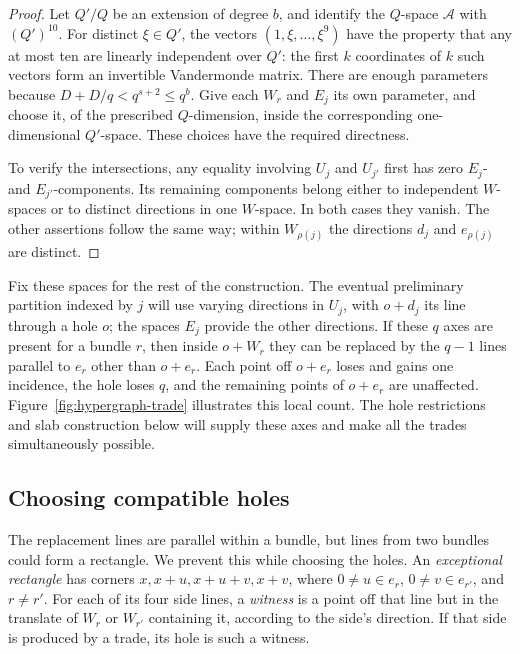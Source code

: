 \begin{proof}
Let $Q'/Q$ be an extension of degree $b$, and identify the $Q$-space
$\mathcal A$ with $(Q')^{10}$.  For distinct $\xi\in Q'$, the vectors
$(1,\xi,\ldots,\xi^9)$ have the property that any at most ten are
linearly independent over $Q'$: the first $k$ coordinates of $k$ such
vectors form an invertible Vandermonde matrix.  There are enough
parameters because
$D+D/q<q^{s+2}\le q^b$.  Give each $W_r$ and $E_j$ its own parameter,
and choose it, of the prescribed $Q$-dimension, inside the corresponding
one-dimensional $Q'$-space.  These choices have the required directness.

To verify the intersections, any equality involving $U_j$ and $U_{j'}$
first has zero $E_j$- and $E_{j'}$-components.  Its remaining components
belong either to independent $W$-spaces or to distinct directions in
one $W$-space.  In both cases they vanish.  The other assertions follow
the same way; within $W_{\rho(j)}$ the directions $d_j$ and $e_{\rho(j)}$
are distinct.
\end{proof}

Fix these spaces for the rest of the construction. The eventual
preliminary partition indexed by $j$ will use varying directions in
$U_j$, with $o+d_j$ its line through a hole $o$; the spaces $E_j$
provide the other directions. If these $q$ axes are present for a
bundle $r$, then inside $o+W_r$ they can be replaced by the $q-1$
lines parallel to $e_r$ other than $o+e_r$. Each point off $o+e_r$
loses and gains one incidence, the hole loses $q$, and the remaining
points of $o+e_r$ are unaffected. Figure~\ref{fig:hypergraph-trade}
illustrates this local count. The hole restrictions and slab construction
below will supply these axes and make all the trades simultaneously
possible.


\subsection{Choosing compatible holes}

The replacement lines are parallel within a bundle, but lines from two
bundles could form a rectangle. We prevent this while choosing the holes.
An \emph{exceptional rectangle} has corners
$x,x+u,x+u+v,x+v$, where $0\ne u\in e_r$, $0\ne v\in e_{r'}$,
and $r\ne r'$.  For each of its four side lines, a \emph{witness}
is a point off that line but in the translate of $W_r$ or $W_{r'}$
containing it, according to the side's direction.
If that side is produced by a trade, its hole is such a witness.

